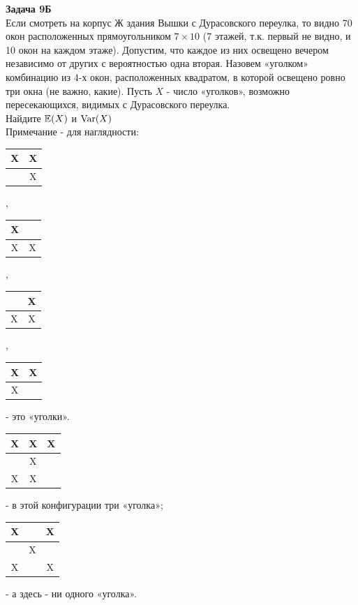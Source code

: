 \documentclass[12pt, a4paper]{article}\usepackage[]{graphicx}\usepackage[]{color}
\begin{document}
	\textbf{Задача 9Б} \\
	Если смотреть на корпус Ж здания Вышки с Дурасовского переулка, то видно 70 окон расположенных прямоугольником $7\times 10$ (7 этажей, т.к. первый не видно, и 10 окон на каждом этаже). Допустим, что каждое из них освещено вечером независимо от других с вероятностью одна вторая. Назовем «уголком» комбинацию из 4-х окон, расположенных квадратом, в которой освещено ровно три окна (не важно, какие). Пусть $X$ - число «уголков», возможно пересекающихся, видимых с Дурасовского переулка. \\
	Найдите  $\mathbb{E}(X)$ и $\operatorname{Var}(X)$ \\
	Примечание - для наглядности: \\
	\begin{tabular}{|c|c|}
		\hline
		X & X\\
		\hline
		& X \\
		\hline
	\end{tabular},
	\begin{tabular}{|c|c|}
		\hline
		X & \\
		\hline
		X & X \\
		\hline
	\end{tabular},
	\begin{tabular}{|c|c|}
		\hline
		& X\\
		\hline
		X & X \\
		\hline
	\end{tabular},
	\begin{tabular}{|c|c|}
		\hline
		X & X\\
		\hline
		X &  \\
		\hline
	\end{tabular} - это «уголки». \\
	\begin{tabular}{|c|c|c|}
		\hline
		X & X & X\\
		\hline
		& X & \\
		\hline
		X & X & \\
		\hline

	\end{tabular} - в этой конфигурации три «уголка»;
	\begin{tabular}{|c|c|c|}
		\hline
		X &  & X\\
		\hline
		& X & \\
		\hline
		X &  & X\\
		\hline

	\end{tabular} - а здесь - ни одного «уголка». \\
\end{document}
